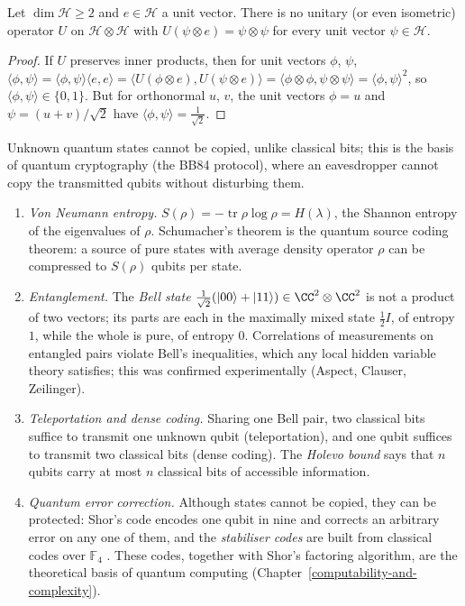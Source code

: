 \begin{theorem}\label{information-theory:theorem-no-cloning}
Let $\dim\mathcal{H} \geq 2$ and $e \in \mathcal{H}$ a unit vector. There is no unitary (or even isometric) operator $U$ on $\mathcal{H} \otimes \mathcal{H}$ with $U(\psi \otimes e) = \psi \otimes \psi$ for every unit vector $\psi \in \mathcal{H}$.
\end{theorem}

\begin{proof}
If $U$ preserves inner products, then for unit vectors $\phi$, $\psi$,
$\langle\phi, \psi\rangle = \langle\phi, \psi\rangle\langle e, e\rangle = \langle U(\phi \otimes e), U(\psi \otimes e)\rangle = \langle\phi \otimes \phi, \psi \otimes \psi\rangle = \langle\phi, \psi\rangle^2$, so $\langle\phi, \psi\rangle \in \{0, 1\}$. But for orthonormal $u$, $v$, the
unit vectors $\phi = u$ and $\psi = (u + v)/\sqrt2$ have $\langle\phi, \psi\rangle = \frac{1}{\sqrt2}$.
\end{proof}

Unknown quantum states cannot be copied, unlike classical bits; this is the basis of quantum cryptography (the BB84 protocol), where an eavesdropper cannot copy the transmitted qubits without disturbing them.

\begin{remark}\label{information-theory:remark-quantum-survey}
\begin{enumerate}
\item \emph{Von Neumann entropy.} $S(\rho) = -\operatorname{tr}\rho\log\rho = H(\lambda)$, the Shannon entropy of the eigenvalues of $\rho$. Schumacher's theorem is the quantum source coding theorem: a source of pure states with
average density operator $\rho$ can be compressed to $S(\rho)$ qubits per state.
\item \emph{Entanglement.} The \emph{Bell state} $\frac{1}{\sqrt2}(|00\rangle + |11\rangle) \in \CC^2 \otimes \CC^2$ is not a product of two vectors; its parts are each in the maximally mixed state $\frac12I$, of entropy $1$, while the whole is
pure, of entropy $0$. Correlations of measurements on entangled pairs violate Bell's inequalities, which any local hidden variable theory satisfies; this was confirmed experimentally (Aspect, Clauser, Zeilinger).
\item \emph{Teleportation and dense coding.} Sharing one Bell pair, two classical bits suffice to transmit one unknown qubit (teleportation), and one qubit suffices to transmit two classical bits (dense coding). The
\emph{Holevo bound} says that $n$ qubits carry at most $n$ classical bits of accessible information.
\item \emph{Quantum error correction.} Although states cannot be copied, they can be protected: Shor's code encodes one qubit in nine and corrects an arbitrary error on any one of them, and the \emph{stabiliser codes} are
built from classical codes over $\mathbb{F}_4$ \cite{nielsen-chuang}. These codes, together with Shor's factoring algorithm, are the theoretical basis of quantum computing (Chapter~\ref{computability-and-complexity}).
\end{enumerate}
\end{remark}

